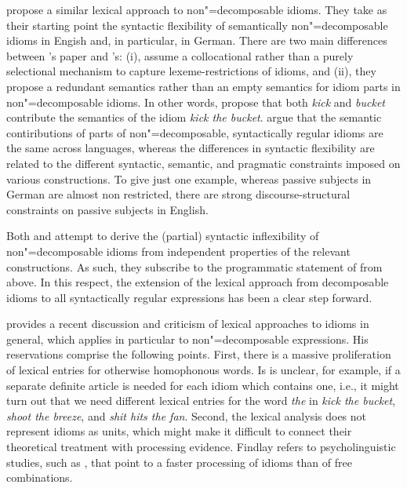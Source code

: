 \documentclass[output=paper]{langsci/langscibook}
\begin{document}
\cite{Bargmann:Sailer:18} propose a similar lexical approach to non"=de\-com\-pos\-able idioms. 
They take as their starting point the syntactic flexibility of semantically non"=decomposable idioms in Engish and, in particular, in German.
There are two main differences between \citeauthor{KSF2015a}'s paper and \citeauthor{Bargmann:Sailer:18}'s: (i), \citeauthor{Bargmann:Sailer:18} assume a collocational rather than a purely selectional mechanism to capture lexeme-restrictions of idioms, and (ii), they propose a redundant semantics rather than an empty semantics for idiom parts in non"=decomposable idioms. In other words, \cite{Bargmann:Sailer:18} propose that both \emph{kick} and \emph{bucket} contribute the semantics of the idiom \emph{kick the bucket}. 
\citeauthor{Bargmann:Sailer:18} argue that the semantic contiributions of parts of non"=decomposable, syntactically regular idioms are the same across languages, whereas the differences in syntactic flexibility are related to the different syntactic, semantic, and pragmatic constraints imposed on various constructions. 
To give just one example, whereas passive subjects in German are almost non restricted, there are strong discourse-structural constraints on passive subjects in English.

Both \cite{KSF2015a} and \cite{Bargmann:Sailer:18} attempt to derive the (partial) syntactic inflexibility of non"=decomposable idioms from independent properties of the relevant constructions. 
As such, they subscribe to the programmatic statement of \cite{NSW94a} from  above.  
In this respect, the extension of the lexical approach from decomposable idioms to all syntactically regular expressions has been a clear step forward. 

\cite{Findlay:17} provides a recent discussion and criticism of lexical approaches to idioms in general, which applies in particular to non"=decomposable expressions. 
His reservations comprise the following points. 
First, there is a massive proliferation of lexical entries for otherwise homophonous words. Is is unclear, for example, if a separate definite article is needed for each idiom which contains one, i.e., it might turn out that we need different lexical entries for the word \emph{the} in \emph{kick the bucket}, \emph{shoot the breeze}, and \emph{shit hits the fan}. 
Second, the lexical analysis does not represent idioms as units, which might make it difficult to connect their theoretical treatment with processing evidence. Findlay refers to psycholinguistic studies, such as \cite{Swinney:Cutler:79}, that point to a faster processing of idioms than of free combinations. 
\end{document}
